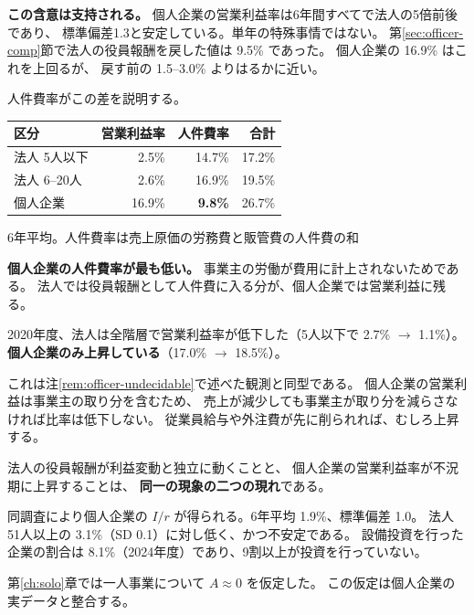 \textbf{この含意は支持される。} 個人企業の営業利益率は6年間すべてで法人の5倍前後であり、
標準偏差1.3と安定している。単年の特殊事情ではない。
第\ref{sec:officer-comp}節で法人の役員報酬を戻した値は 9.5\% であった。
個人企業の 16.9\% はこれを上回るが、
戻す前の 1.5--3.0\% よりはるかに近い。

人件費率がこの差を説明する。

\begin{center}
\begin{tabular}{@{}lrrr@{}}
\toprule
区分 & 営業利益率 & 人件費率 & 合計 \\
\midrule
法人 5人以下 & 2.5\% & 14.7\% & 17.2\% \\
法人 6--20人 & 2.6\% & 16.9\% & 19.5\% \\
個人企業 & 16.9\% & \textbf{9.8\%} & 26.7\% \\
\bottomrule
\end{tabular}
\label{tab:individual-vs-corp-laborcost}
\end{center}
\begin{center}\footnotesize 6年平均。人件費率は売上原価の労務費と販管費の人件費の和\end{center}

\textbf{個人企業の人件費率が最も低い。}
事業主の労働が費用に計上されないためである。
法人では役員報酬として人件費に入る分が、個人企業では営業利益に残る。

\begin{remark}[コロナ期に符号が逆転する]
\label{rem:covid-reversal}
2020年度、法人は全階層で営業利益率が低下した（5人以下で 2.7\% $\to$ 1.1\%）。
\textbf{個人企業のみ上昇している}（17.0\% $\to$ 18.5\%）。

これは注\ref{rem:officer-undecidable}で述べた観測と同型である。
個人企業の営業利益は事業主の取り分を含むため、
売上が減少しても事業主が取り分を減らさなければ比率は低下しない。
従業員給与や外注費が先に削られれば、むしろ上昇する。

法人の役員報酬が利益変動と独立に動くことと、
個人企業の営業利益率が不況期に上昇することは、
\textbf{同一の現象の二つの現れ}である。
\end{remark}

\begin{remark}[個人企業の設備投資]
\label{rem:individual-capex}
同調査により個人企業の $I/r$ が得られる。6年平均 1.9\%、標準偏差 1.0。
法人 51人以上の 3.1\%（SD 0.1）に対し低く、かつ不安定である。
設備投資を行った企業の割合は 8.1\%（2024年度）であり、9割以上が投資を行っていない。

第\ref{ch:solo}章では一人事業について $A\approx 0$ を仮定した。
この仮定は個人企業の実データと整合する。
\end{remark}

